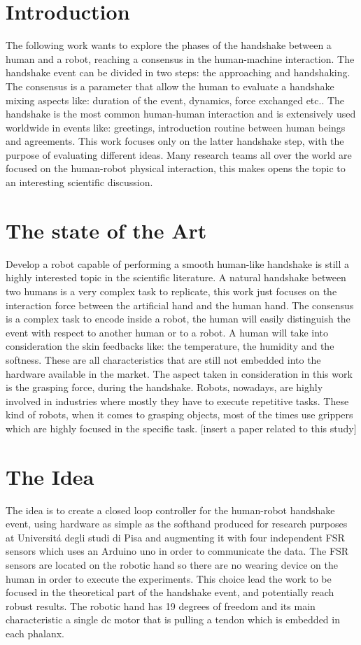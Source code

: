 \chapter*{Introduction}
The following work wants to explore the phases of the handshake between a human and a robot, reaching a consensus in the human-machine interaction. The handshake event can be divided in two steps: the approaching and handshaking. The consensus is a parameter that allow the human to evaluate a handshake mixing aspects like: duration of the event, dynamics, force exchanged etc.. 
The handshake is the most common human-human interaction and is extensively used worldwide in events like: greetings, introduction routine between human beings and agreements. 
This work focuses only on the latter handshake step, with the purpose of evaluating different ideas.
Many research teams all over the world are focused on the human-robot physical interaction, this makes opens the topic to an interesting scientific discussion.  


\chapter{The state of the Art}
Develop a robot capable of performing a smooth human-like handshake is still a highly interested topic in the scientific literature.
A natural handshake between two humans is a very complex task to replicate, this work just focuses on the interaction force between the artificial hand and the human hand.
The consensus is a complex task to encode inside a robot, the human will easily distinguish the event with respect to another human or to a robot. A human will take into consideration the skin feedbacks like: the temperature, the humidity and the softness. These are all characteristics that are still not embedded into the hardware available in the market. The aspect taken in consideration in this work is the grasping force, during the handshake. 
Robots, nowadays, are highly involved in industries where mostly they have to execute repetitive tasks. These kind of robots, when it comes to grasping objects, most of the times use grippers which are highly focused in the specific task. [insert a paper related to this study]

\cite{facialexpressions}
\cite{espen}
\cite{mirrorgame}
\cite{papageorgiou}

\chapter{The Idea}
The idea is to create a closed loop controller for the human-robot handshake event, using hardware as simple as the softhand produced for research purposes at Universit\'a degli studi di Pisa and augmenting it with four independent FSR sensors which uses an Arduino uno in order to communicate the data.
The FSR sensors are located on the robotic hand so there are no wearing device on the human in order to execute the experiments.
This choice lead the work to be focused in the theoretical part of the handshake event, and potentially reach robust results. 
The robotic hand has 19 degrees of freedom and its main characteristic a single dc motor that is pulling a tendon which is embedded in each phalanx. 

